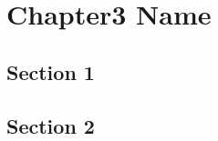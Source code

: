 
\chapter{Chapter3 Name} 


\label{ch3}
\setlength{\parindent}{4ex}

\section{Section 1}
\lipsum[50]

\section{Section 2}
\lipsum[50]
